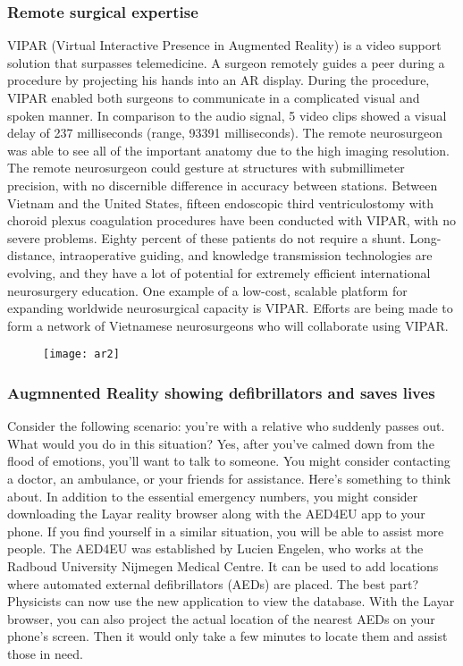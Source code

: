 \documentclass[12pt]{article}
\begin{document}
\subsubsection{Remote surgical expertise}
VIPAR (Virtual Interactive Presence in Augmented Reality) is a video support solution that surpasses telemedicine. A surgeon remotely guides a peer during a procedure by projecting his hands into an AR display. 
                                   During the procedure, VIPAR enabled both surgeons to communicate in a complicated visual and spoken manner. In comparison to the audio signal, 5 video clips showed a visual delay of 237 milliseconds (range, 93391 milliseconds). The remote neurosurgeon was able to see all of the important anatomy due to the high imaging resolution. The remote neurosurgeon could gesture at structures with submillimeter precision, with no discernible difference in accuracy between stations. Between Vietnam and the United States, fifteen endoscopic third ventriculostomy with choroid plexus coagulation procedures have been conducted with VIPAR, with no severe problems. Eighty percent of these patients do not require a shunt.
                                                                  Long-distance, intraoperative guiding, and knowledge transmission technologies are evolving, and they have a lot of potential for extremely efficient international neurosurgery education. One example of a low-cost, scalable platform for expanding worldwide neurosurgical capacity is VIPAR. Efforts are being made to form a network of Vietnamese neurosurgeons who will collaborate using VIPAR.
                                                                  

\begin{figure}[h]
\centering
\texttt{[image: ar2]}

\end{figure}                                                                  
\subsubsection{	Augmnented Reality showing defibrillators and saves lives }
Consider the following scenario: you're with a relative who suddenly passes out. What would you do in this situation? Yes, after you've calmed down from the flood of emotions, you'll want to talk to someone. You might consider contacting a doctor, an ambulance, or your friends for assistance.
Here's something to think about. In addition to the essential emergency numbers, you might consider downloading the Layar reality browser along with the AED4EU app to your phone. If you find yourself in a similar situation, you will be able to assist more people.
The AED4EU was established by Lucien Engelen, who works at the Radboud University Nijmegen Medical Centre. It can be used to add locations where automated external defibrillators (AEDs) are placed. The best part? Physicists can now use the new application to view the database.
With the Layar browser, you can also project the actual location of the nearest AEDs on your phone's screen. Then it would only take a few minutes to locate them and assist those in need.
\end{document}
